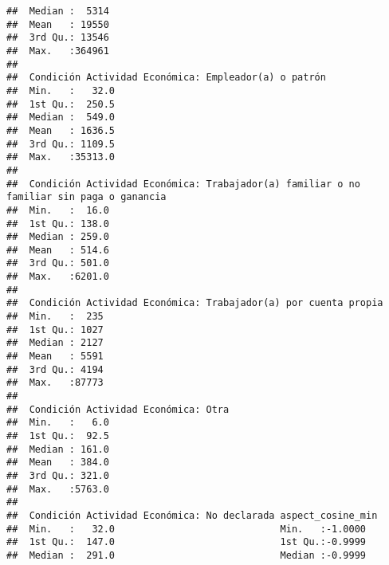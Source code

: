 \documentclass[11pt,]{article}
\begin{document}
\begin{verbatim}
##  Median :  5314                                               
##  Mean   : 19550                                               
##  3rd Qu.: 13546                                               
##  Max.   :364961                                               
##                                                               
##  Condición Actividad Económica: Empleador(a) o patrón
##  Min.   :   32.0                                     
##  1st Qu.:  250.5                                     
##  Median :  549.0                                     
##  Mean   : 1636.5                                     
##  3rd Qu.: 1109.5                                     
##  Max.   :35313.0                                     
##                                                      
##  Condición Actividad Económica: Trabajador(a) familiar o no familiar sin paga o ganancia
##  Min.   :  16.0                                                                         
##  1st Qu.: 138.0                                                                         
##  Median : 259.0                                                                         
##  Mean   : 514.6                                                                         
##  3rd Qu.: 501.0                                                                         
##  Max.   :6201.0                                                                         
##                                                                                         
##  Condición Actividad Económica: Trabajador(a) por cuenta propia
##  Min.   :  235                                                 
##  1st Qu.: 1027                                                 
##  Median : 2127                                                 
##  Mean   : 5591                                                 
##  3rd Qu.: 4194                                                 
##  Max.   :87773                                                 
##                                                                
##  Condición Actividad Económica: Otra
##  Min.   :   6.0                     
##  1st Qu.:  92.5                     
##  Median : 161.0                     
##  Mean   : 384.0                     
##  3rd Qu.: 321.0                     
##  Max.   :5763.0                     
##                                     
##  Condición Actividad Económica: No declarada aspect_cosine_min
##  Min.   :   32.0                             Min.   :-1.0000  
##  1st Qu.:  147.0                             1st Qu.:-0.9999  
##  Median :  291.0                             Median :-0.9999  

\end{verbatim}
\end{document}
